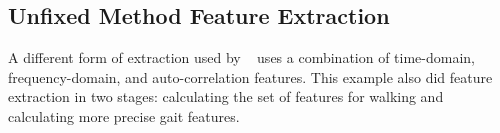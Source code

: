 \documentclass{sig-alternate}
\begin{document}
\subsection{Unfixed Method Feature Extraction}
	A different form of extraction used by ~\cite{Lu:2014} uses a combination of time-domain, frequency-domain, and auto-correlation features. This example also did feature extraction in two stages: calculating the set of features for walking and calculating more precise gait features. 
\end{document}
